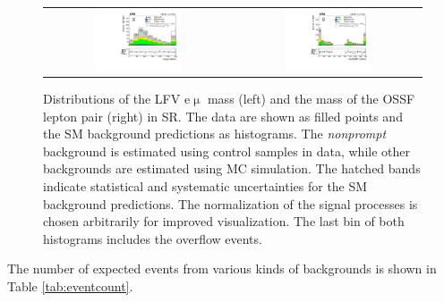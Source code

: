 \begin{figure}[tbh!]
 \begin{center}
 \begin{tabular}{cc}
 \includegraphics[width=0.48\textwidth]{figures/Part3/Nonprompt/SR/Memu}&
 \includegraphics[width=0.48\textwidth]{figures/Part3/Nonprompt/SR/Zmass} \\
 \end{tabular}
 \caption{Distributions of the LFV e$\upmu$ mass (left) and the mass of the \ac{OSSF} lepton pair (right) in \ac{SR}. The data are shown as filled points and the \ac{SM} background predictions as histograms. The \emph{nonprompt} background is estimated using control samples in data, while other backgrounds are estimated using \ac{MC} simulation. The hatched bands indicate statistical and systematic uncertainties for the \ac{SM} background predictions. The normalization of the signal processes is chosen arbitrarily for improved visualization. The last bin of both histograms includes the overflow events.}
 \label{fig:SR_DataDriven_1}
 \end{center}
\end{figure}

The number of expected events from various kinds of backgrounds is shown in Table \ref{tab:eventcount}. 

